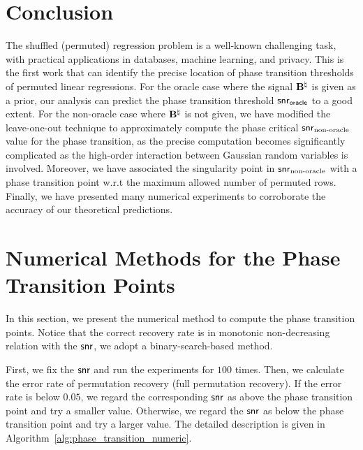 \documentclass[11pt]{article}
\def \oracle{\mathsf{oracle}}
\begin{document}
\section{Conclusion}

The shuffled (permuted) regression problem is a well-known challenging task, with  practical applications in databases, machine learning, and privacy. This is the first work that can
identify the precise location of
phase transition thresholds of permuted
linear regressions.
For the oracle case
where the signal $\mathbf{B}^{\natural}$ is given as a prior, our analysis can predict the
phase transition threshold $\snr_{\oracle}$ to a good extent.
For the non-oracle case
where $\mathbf{B}^{\natural}$ is not given, we have
modified the leave-one-out technique
to approximately compute the phase critical $\mathsf{snr}_{\textup{non-oracle}}$ value
for the phase transition, as the precise computation becomes significantly complicated
as the high-order interaction between Gaussian random variables is involved.
Moreover, we have associated the singularity point in $\mathsf{snr}_{\textup{non-oracle}}$ with
a phase transition point w.r.t the maximum allowed number of permuted rows. Finally, we have   presented  many numerical experiments to corroborate the accuracy of our theoretical predictions.









\newpage\clearpage

\appendix
\allowdisplaybreaks

\section{Numerical Methods for the Phase Transition Points}
In this section, we present the numerical method to compute the phase transition points. Notice that the correct recovery rate is in monotonic non-decreasing relation with the $\mathsf{snr}$, we adopt a binary-search-based method.
\par
First, we fix the $\mathsf{snr}$ and run the experiments for
 $100$ times. Then, we calculate the error rate of permutation recovery (full permutation recovery). If the error rate is below $0.05$, we regard the corresponding $\mathsf{snr}$ as above the phase transition point and try a smaller value. Otherwise, we regard the $\mathsf{snr}$ as below the phase transition point and try a larger value. The detailed description is given in Algorithm~\ref{alg:phase_transition_numeric}.
\end{document}
